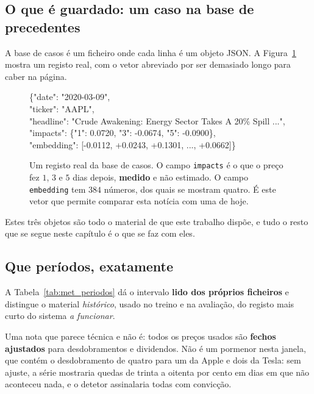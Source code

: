 \subsection{O que é guardado: um caso na base de precedentes}

A base de casos é um ficheiro onde cada linha é um objeto \gls{JSON}. A
Figura~\ref{fig:met_registo} mostra um registo real, com o vetor abreviado por ser demasiado longo
para caber na página.

\begin{figure}[ht]
\centering
\begin{tcolorbox}[colback=black!3, colframe=black!30, boxrule=0.4pt, arc=2pt,
                  width=0.96\textwidth, fontupper=\ttfamily\footnotesize]
\{"date": "2020-03-09",\\
\hspace*{1em}"ticker": "AAPL",\\
\hspace*{1em}"headline": "Crude Awakening: Energy Sector Takes A 20\% Spill ...",\\
\hspace*{1em}"impacts": \{"1": 0.0720, "3": -0.0674, "5": -0.0900\},\\
\hspace*{1em}"embedding": [-0.0112, +0.0243, +0.1301, ..., +0.0662]\}
\end{tcolorbox}
\caption[Um caso guardado na base de precedentes]{Um registo real da base de casos. O campo
\texttt{impacts} é o que o preço fez $1$, $3$ e $5$ dias depois, \textbf{medido} e não estimado. O
campo \texttt{embedding} tem $384$ números, dos quais se mostram quatro. É este vetor que permite
comparar esta notícia com uma de hoje.}
\label{fig:met_registo}
\end{figure}

Estes três objetos são todo o material de que este trabalho dispõe, e tudo o resto que se segue
neste capítulo é o que se faz com eles.

\subsection{Que períodos, exatamente}

A Tabela~\ref{tab:met_periodos} dá o intervalo \textbf{lido dos próprios ficheiros} e distingue o
material \emph{histórico}, usado no treino e na avaliação, do registo mais curto do sistema
\emph{a funcionar}.

Uma nota que parece técnica e não é: todos os preços usados são \textbf{fechos ajustados} para
desdobramentos e dividendos. Não é um pormenor nesta janela, que contém o desdobramento de quatro
para um da Apple e dois da Tesla: sem ajuste, a série mostraria quedas de trinta a oitenta por
cento em dias em que não aconteceu nada, e o detetor assinalaria todas com convicção.

